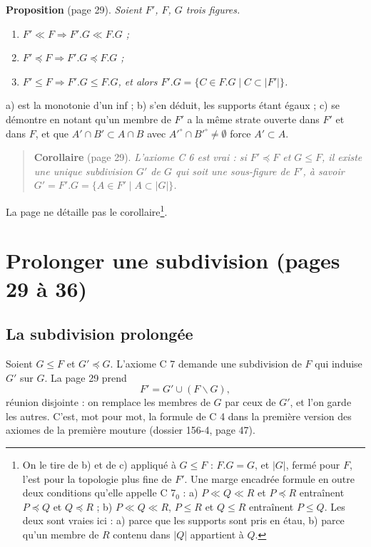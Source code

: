 \documentclass[11pt,a4paper]{article}
\begin{document}
\textbf{Proposition} (page 29). \emph{Soient $F'$, $F$, $G$ trois figures.}
\begin{enumerate}
\item[a)] \emph{$F' \ll F \Rightarrow F'.G \ll F.G$ ;}
\item[b)] \emph{$F' \preccurlyeq F \Rightarrow F'.G \preccurlyeq F.G$ ;}
\item[c)] \emph{$F' \leq F \Rightarrow F'.G \leq F.G$, et alors $F'.G = \{C \in
F.G \mid C \subset |F'|\}$.}
\end{enumerate}

a) est la monotonie d'un inf ; b) s'en déduit, les supports étant égaux ; c) se
démontre en notant qu'un membre de $F'$ a la même strate ouverte dans $F'$ et
dans $F$, et que $A' \cap B' \subset A \cap B$ avec $A'^{\circ} \cap B'^{\circ}
\neq \emptyset$ force $A' \subset A$.

\begin{quote}
\textbf{Corollaire} (page 29). \emph{L'axiome C 6 est vrai : si $F'
\preccurlyeq F$ et $G \leq F$, il existe une unique subdivision $G'$ de $G$ qui
soit une sous-figure de $F'$, à savoir $G' = F'.G = \{A \in F' \mid A \subset
|G|\}$.}
\end{quote}

\noindent La page ne détaille pas le corollaire\footnote{On le tire de b) et de
c) appliqué à $G \leq F$ : $F.G = G$, et $|G|$, fermé pour $F$, l'est pour la
topologie plus fine de $F'$. Une marge encadrée formule en outre deux conditions
qu'elle appelle C 7${}_{0}$ : a) $P \ll Q \ll R$ et $P \preccurlyeq R$
entraînent $P \preccurlyeq Q$ et $Q \preccurlyeq R$ ; b) $P \ll Q \ll R$, $P
\leq R$ et $Q \leq R$ entraînent $P \leq Q$. Les deux sont vraies ici : a) parce
que les supports sont pris en étau, b) parce qu'un membre de $R$ contenu dans
$|Q|$ appartient à $Q$.}.

\section*{Prolonger une subdivision (pages 29 à 36)}

\subsection*{La subdivision prolongée}

Soient $G \leq F$ et $G' \preccurlyeq G$. L'axiome C 7 demande une subdivision
de $F$ qui induise $G'$ sur $G$. La page 29 prend
\[
F' = G' \cup (F \smallsetminus G),
\]
réunion disjointe : on remplace les membres de $G$ par ceux de $G'$, et l'on
garde les autres. C'est, mot pour mot, la formule de C 4 dans la première
version des axiomes de la première mouture (dossier 156-4, page 47).
\end{document}
